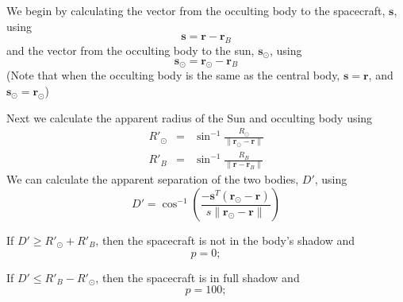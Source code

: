 We begin by calculating the vector from the occulting body to the
spacecraft, $\mathbf{s}$, using
%
\begin{equation}
     \mathbf{s} = \mathbf{r} - \mathbf{r}_B
\end{equation}
%
and the vector from the occulting body to the sun,
$\mathbf{s}_\odot$, using
%
\begin{equation}
     \mathbf{s}_\odot = \mathbf{r}_\odot - \mathbf{r}_B
\end{equation}
%
(Note that when the occulting body is the same as the central body,
$\mathbf{s} = \mathbf{r}$, and $\mathbf{s}_\odot =
\mathbf{r}_\odot$)

Next we calculate the apparent radius of the Sun and occulting body
using
%
\begin{eqnarray}
     R'_\odot & = & \sin^{-1}\frac{R_\odot}{\|\mathbf{r}_\odot - \mathbf{r} \|}\\
     R'_B & = & \sin^{-1}\frac{R_B}{\|\mathbf{r}  - \mathbf{r}_B\|}
\end{eqnarray}
%
We can calculate the apparent separation of the two bodies, $D'$,
using
%
\begin{equation}
    D' = \cos^{-1}\left(\frac{-\mathbf{s}^T\left( \mathbf{r}_\odot - \mathbf{r} \right)}{s \|\mathbf{r}_\odot - \mathbf{r}
    \|}\right)
\end{equation}
%

If $ D' \geq R'_\odot + R'_B $, then the spacecraft is not in the
body's shadow and
%
\begin{equation}
    p = 0;
\end{equation}
%

If $D' \leq R'_B - R'_\odot$, then the spacecraft is in full shadow
and
%
\begin{equation}
    p = 100;
\end{equation}
%

